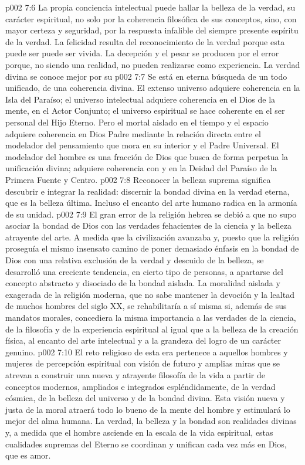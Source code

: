 \vs p002 7:6 La propia conciencia intelectual puede hallar la belleza de la verdad, su carácter espiritual, no solo por la coherencia filosófica de sus conceptos, sino, con mayor certeza y seguridad, por la respuesta infalible del siempre presente espíritu de la verdad. La felicidad resulta del reconocimiento de la verdad porque esta puede ser  puede ser vivida. La decepción y el pesar se producen por el error porque, no siendo una realidad, no pueden realizarse como experiencia. La verdad divina se conoce mejor por su 
\vs p002 7:7 \pc Se está en eterna búsqueda de un todo unificado, de una coherencia divina. El extenso universo adquiere coherencia en la Isla del Paraíso; el universo intelectual adquiere coherencia en el Dios de la mente, en el Actor Conjunto; el universo espiritual se hace coherente en el ser personal del Hijo Eterno. Pero el mortal aislado en el tiempo y el espacio adquiere coherencia en Dios Padre mediante la relación directa entre el modelador del pensamiento que mora en su interior y el Padre Universal. El modelador del hombre es una fracción de Dios que busca de forma perpetua la unificación divina; adquiere coherencia con y en la Deidad del Paraíso de la Primera Fuente y Centro.
\vs p002 7:8 \pc Reconocer la belleza suprema significa descubrir e integrar la realidad: discernir la bondad divina en la verdad eterna, que es la belleza última. Incluso el encanto del arte humano radica en la armonía de su unidad.
\vs p002 7:9 El gran error de la religión hebrea se debió a que no supo asociar la bondad de Dios con las verdades fehacientes de la ciencia y la belleza atrayente del arte. A medida que la civilización avanzaba y, puesto que la religión proseguía el mismo insensato camino de poner demasiado énfasis en la bondad de Dios con una relativa exclusión de la verdad y descuido de la belleza, se desarrolló una creciente tendencia, en cierto tipo de personas, a apartarse del concepto abstracto y disociado de la bondad aislada. La moralidad aislada y exagerada de la religión moderna, que no sabe mantener la devoción y la lealtad de muchos hombres del siglo XX, se rehabilitaría a sí misma si, además de sus mandatos morales, concediera la misma importancia a las verdades de la ciencia, de la filosofía y de la experiencia espiritual al igual que a la belleza de la creación física, al encanto del arte intelectual y a la grandeza del logro de un carácter genuino.
\vs p002 7:10 El reto religioso de esta era pertenece a aquellos hombres y mujeres de percepción espiritual con visión de futuro y amplias miras que se atrevan a construir una nueva y atrayente filosofía de la vida a partir de conceptos modernos, ampliados e integrados espléndidamente, de la verdad cósmica, de la belleza del universo y de la bondad divina. Esta visión nueva y justa de la moral atraerá todo lo bueno de la mente del hombre y estimulará lo mejor del alma humana. La verdad, la belleza y la bondad son realidades divinas y, a medida que el hombre asciende en la escala de la vida espiritual, estas cualidades supremas del Eterno se coordinan y unifican cada vez más en Dios, que es amor.

